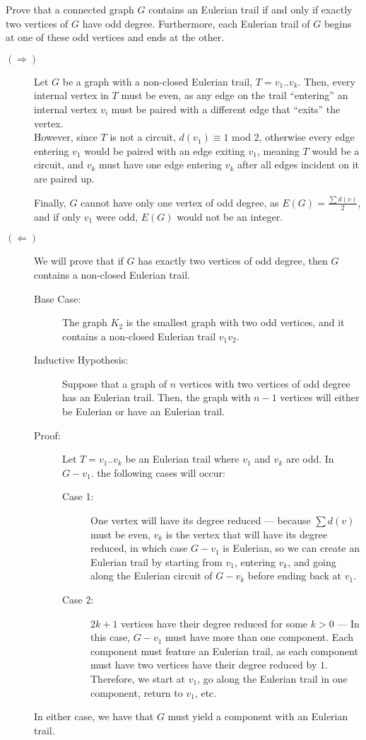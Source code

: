 \documentclass[8pt]{extarticle}
\title{}
\author{Avinash Iyer}
\date{}
\begin{document}
  \begin{problem}{2}
    Prove that a connected graph $G$ contains an Eulerian trail if and only if exactly two vertices of $G$ have odd degree. Furthermore, each Eulerian trail of $G$ begins at one of these odd vertices and ends at the other.
    \tcblower
    \begin{description}
      \item[$(\Rightarrow)$] Let $G$ be a graph with a non-closed Eulerian trail, $T = v_1..v_k$. Then, every internal vertex in $T$ must be even, as any edge on the trail ``entering'' an internal vertex $v_i$ must be paired with a different edge that ``exits'' the vertex.\\

        However, since $T$ is not a circuit, $d(v_1)\equiv 1$ mod 2, otherwise every edge entering $v_1$ would be paired with an edge exiting $v_1$, meaning $T$ would be a circuit, and $v_k$ must have one edge entering $v_k$ after all edges incident on it are paired up.

        Finally, $G$ cannot have only one vertex of odd degree, as $E(G) = \frac{\sum d(v)}{2}$, and if only $v_1$ were odd, $E(G)$ would not be an integer.
      \item[$(\Leftarrow)$] We will prove that if $G$ has exactly two vertices of odd degree, then $G$ contains a non-closed Eulerian trail.
        \begin{description}
          \item[Base Case:] The graph $K_2$ is the smallest graph with two odd vertices, and it contains a non-closed Eulerian trail $v_1v_2$.
          \item[Inductive Hypothesis:] Suppose that a graph of $n$ vertices with two vertices of odd degree has an Eulerian trail. Then, the graph with $n-1$ vertices will either be Eulerian or have an Eulerian trail.
          \item[Proof:] Let $T = v_1..v_k$ be an Eulerian trail where $v_1$ and $v_k$ are odd. In $G-v_1$. the following cases will occur:
            \begin{description}
              \item[Case 1:] One vertex will have its degree reduced --- because $\sum d(v)$ must be even, $v_k$ is the vertex that will have its degree reduced, in which case $G - v_1$ is Eulerian, so we can create an Eulerian trail by starting from $v_1$, entering $v_k$, and going along the Eulerian circuit of $G-v_k$ before ending back at $v_1$.
              \item[Case 2:] $2k+1$ vertices have their degree reduced for some $k>0$ --- In this case, $G-v_1$ must have more than one component. Each component must feature an Eulerian trail, as each component must have two vertices have their degree reduced by $1$. Therefore, we start at $v_1$, go along the Eulerian trail in one component, return to $v_1$, etc.
            \end{description}
        \end{description}
        In either case, we have that $G$ must yield a component with an Eulerian trail.
    \end{description}
  \end{problem}
\end{document}
